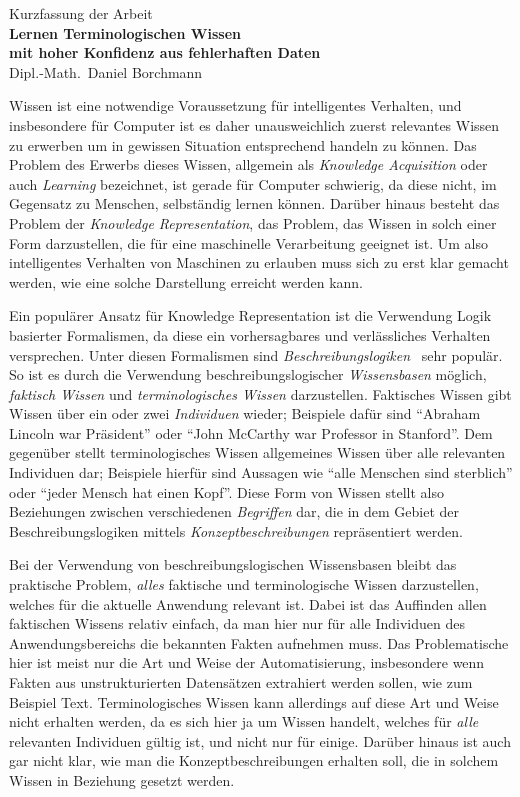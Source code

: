 \documentclass[ngerman,fleqn,DIV=12]{scrartcl}
\begin{document}
\medskip
\begin{center}
  \normalsize Kurzfassung der Arbeit\\
  \LARGE\textbf{Lernen Terminologischen Wissen\\ mit hoher Konfidenz aus fehlerhaften Daten}\\
  \bigskip%
  \large Dipl.-Math.\ Daniel Borchmann
\end{center}
\bigskip
\bigskip

\noindent
Wissen ist eine notwendige Voraussetzung für intelligentes Verhalten, und insbesondere für
Computer ist es daher unausweichlich zuerst relevantes Wissen zu erwerben um in gewissen
Situation entsprechend handeln zu können.  Das Problem des Erwerbs dieses Wissen,
allgemein als \emph{Knowledge Acquisition} oder auch \emph{Learning} bezeichnet, ist
gerade für Computer schwierig, da diese nicht, im Gegensatz zu Menschen, selbständig
lernen können.  Darüber hinaus besteht das Problem der \emph{Knowledge Representation},
\dh das Problem, das Wissen in solch einer Form darzustellen, die für eine maschinelle
Verarbeitung geeignet ist.  Um also intelligentes Verhalten von Maschinen zu erlauben muss
sich zu erst klar gemacht werden, wie eine solche Darstellung erreicht werden kann.

Ein populärer Ansatz für Knowledge Representation ist die Verwendung Logik basierter
Formalismen, da diese ein vorhersagbares und verlässliches Verhalten versprechen.  Unter
diesen Formalismen sind \emph{Beschreibungslogiken}~\cite{DLhandbook} sehr populär.  So
ist es durch die Verwendung beschreibungslogischer \emph{Wissensbasen} möglich,
\emph{faktisch Wissen} und \emph{terminologisches Wissen} darzustellen.  Faktisches Wissen
gibt Wissen über ein oder zwei \emph{Individuen} wieder; Beispiele dafür sind
\enquote{Abraham Lincoln war Präsident} oder \enquote{John McCarthy war Professor in
  Stanford}.  Dem gegenüber stellt terminologisches Wissen allgemeines Wissen über alle
relevanten Individuen dar; Beispiele hierfür sind Aussagen wie \enquote{alle Menschen sind
  sterblich} oder \enquote{jeder Mensch hat einen Kopf}.  Diese Form von Wissen stellt
also Beziehungen zwischen verschiedenen \emph{Begriffen} dar, die in dem Gebiet der
Beschreibungslogiken mittels \emph{Konzeptbeschreibungen} repräsentiert werden.

Bei der Verwendung von beschreibungslogischen Wissensbasen bleibt das praktische Problem,
\emph{alles} faktische und terminologische Wissen darzustellen, welches für die aktuelle
Anwendung relevant ist.  Dabei ist das Auffinden allen faktischen Wissens relativ einfach,
da man hier nur für alle Individuen des Anwendungsbereichs die bekannten Fakten aufnehmen
muss.  Das Problematische hier ist meist nur die Art und Weise der Automatisierung,
insbesondere wenn Fakten aus unstrukturierten Datensätzen extrahiert werden sollen, wie
zum Beispiel Text.  Terminologisches Wissen kann allerdings auf diese Art und Weise nicht
erhalten werden, da es sich hier ja um Wissen handelt, welches für \emph{alle} relevanten
Individuen gültig ist, und nicht nur für einige.  Darüber hinaus ist auch gar nicht klar,
wie man die Konzeptbeschreibungen erhalten soll, die in solchem Wissen in Beziehung
gesetzt werden.
\end{document}
